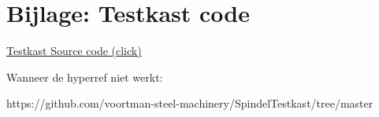 \appendix

\section{Bijlage: Testkast code} \label{sec:TestkastSourceCode}

\href{run:https://github.com/voortman-steel-machinery/SpindelTestkast/tree/master}{Testkast Source code (click)}

\vspace{0.5cm}

Wanneer de hyperref niet werkt:
\vspace{0.5cm}

https://github.com/voortman-steel-machinery/SpindelTestkast/tree/master

